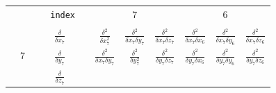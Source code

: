 \documentclass{article}
\begin{document}
\begin{figure}[htb]
\begin{center}

\begin{tabular}{c|c|cc|c|cc|ccc|ccc|}

\cline{8-13}

\multicolumn{6}{r}{\texttt{index}} & &
& $7$ & &
& $6$ & \\

\cline{8-13}

\multicolumn{13}{c}{ }

\\

\cline{2-2}
\cline{5-5}
\cline{8-13}

\hspace{0.2cm} & & \hspace{0.2cm} & \hspace{0.2cm} &

$\frac{\delta}{\delta x_7}$ & \hspace{0.2cm} & \hspace{0.2cm} &

$\frac{\delta^2}{\delta x_7^2}         $ & 
$\frac{\delta^2}{\delta x_7 \delta y_7}$ & 
$\frac{\delta^2}{\delta x_7 \delta z_7}$ & 

$\frac{\delta^2}{\delta x_7 \delta x_6}$ & 
$\frac{\delta^2}{\delta x_7 \delta y_6}$ & 
$\frac{\delta^2}{\delta x_7 \delta z_6}$ \\


\hspace{0.2cm} & $7$ & \hspace{0.2cm} & \hspace{0.2cm} &

$\frac{\delta}{\delta y_7}$ & \hspace{0.2cm} & \hspace{0.2cm} &

$\frac{\delta^2}{\delta x_7 \delta y_7}$ & 
$\frac{\delta^2}{\delta y_7^2}         $ & 
$\frac{\delta^2}{\delta y_7 \delta z_7}$ & 

$\frac{\delta^2}{\delta y_7 \delta x_6}$ & 
$\frac{\delta^2}{\delta y_7 \delta y_6}$ & 
$\frac{\delta^2}{\delta y_7 \delta z_6}$ \\


\hspace{0.2cm} & & \hspace{0.2cm} & \hspace{0.2cm} &

$\frac{\delta}{\delta z_7}$ & \hspace{0.2cm} & \hspace{0.2cm} &


\end{tabular}
\end{center}
\end{figure}
\end{document}
